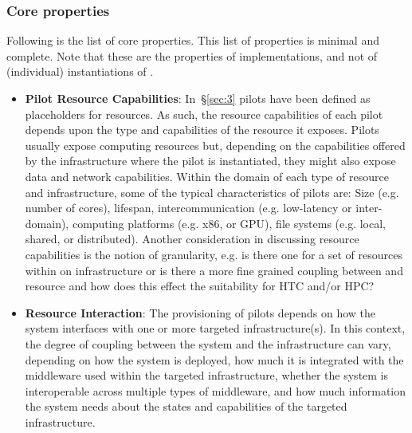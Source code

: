 \documentclass{sig-alternate}
\begin{document}
\subsubsection{Core properties}

Following is the list of core properties. This list of properties is minimal
and complete. Note that these are the properties of \pilot implementations, and
not of (individual) instantiations of \pilots.

\begin{itemize}

\item \textbf{Pilot Resource Capabilities}: In~\S\ref{sec:3} pilots have been
  defined as placeholders for resources. As such, the resource capabilities of
  each pilot depends upon the type and capabilities of the resource it exposes.
  Pilots usually expose computing resources but, depending on the capabilities
  offered by the infrastructure where the pilot is instantiated, they might
  also expose data and network capabilities. Within the domain of each type of
  resource and infrastructure, some of the typical characteristics of pilots
  are: Size (e.g. number of cores), lifespan, intercommunication (e.g.
  low-latency or inter-domain), computing platforms (e.g. x86, or GPU),
  file systems (e.g. local, shared, or distributed).
  Another consideration in discussing \pilot resource capabilities is the
  notion of granularity, e.g. is there one \pilot for a set of resources within
  on infrastructure or is there a more fine grained coupling between \pilot and
  resource and how does this effect the suitability for HTC and/or HPC?


\item \textbf{Resource Interaction}: The provisioning of pilots
  depends on how the \pilot system interfaces with one or more
  targeted infrastructure(s). In this context, the degree of coupling
  between the \pilot system and the infrastructure can vary,
  depending on how the \pilot system is deployed, how much it is
  integrated with the middleware used within the targeted
  infrastructure, whether the \pilot system is interoperable across
  multiple types of middleware, and how much information the \pilot
  system needs about the states and capabilities of the targeted
  infrastructure.


\end{itemize}
\end{document}

